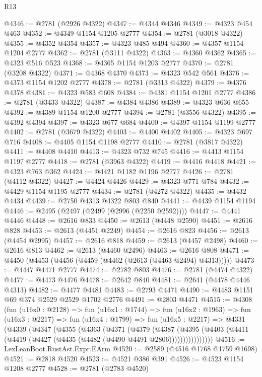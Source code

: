 \begin{lexlean}{R13}
\begin{coremodule}
@4346 := @2781 (@2926 @4322)
@4347 := @4344 @4346
@4349 := @4323 @454 @463
@4352 := @4349 @1154 @1205 @2777
@4354 := @2781 (@3018 @4322)
@4355 := @4352 @4354
@4357 := @4323 @485 @494
@4360 := @4357 @1154 @1204 @2777
@4362 := @2781 (@3111 @4322)
@4363 := @4360 @4362
@4365 := @4323 @516 @523
@4368 := @4365 @1154 @1203 @2777
@4370 := @2781 (@3208 @4322)
@4371 := @4368 @4370
@4373 := @4323 @542 @561
@4376 := @4373 @1154 @1202 @2777
@4378 := @2781 (@3313 @4322)
@4379 := @4376 @4378
@4381 := @4323 @583 @608
@4384 := @4381 @1154 @1201 @2777
@4386 := @2781 (@3433 @4322)
@4387 := @4384 @4386
@4389 := @4323 @636 @655
@4392 := @4389 @1154 @1200 @2777
@4394 := @2781 (@3556 @4322)
@4395 := @4392 @4394
@4397 := @4323 @677 @684
@4400 := @4397 @1154 @1199 @2777
@4402 := @2781 (@3679 @4322)
@4403 := @4400 @4402
@4405 := @4323 @697 @716
@4408 := @4405 @1154 @1198 @2777
@4410 := @2781 (@3817 @4322)
@4411 := @4408 @4410
@4413 := @4323 @732 @745
@4416 := @4413 @1154 @1197 @2777
@4418 := @2781 (@3963 @4322)
@4419 := @4416 @4418
@4421 := @4323 @763 @362
@4424 := @4421 @1182 @1196 @2777
@4426 := @2781 (@4112 @4322)
@4427 := @4424 @4426
@4429 := @4323 @771 @784
@4432 := @4429 @1154 @1195 @2777
@4434 := @2781 (@4272 @4322)
@4435 := @4432 @4434
@4439 := @2750 @4313 @4322 @803 @840
@4441 := @4439 @1154 @1194
@4446 := @2495 (@2497 (@2499 (@2996 (@2250 @2592))))
@4447 := @4441 @4446
@4448 := @2616 @833
@4450 := @2613 (@4448 @2590)
@4451 := @2616 @828
@4453 := @2613 (@4451 @2249)
@4454 := @2616 @823
@4456 := @2613 (@4454 @2995)
@4457 := @2616 @818
@4459 := @2613 (@4457 @2498)
@4460 := @2616 @813
@4462 := @2613 (@4460 @2496)
@4463 := @2616 @808
@4471 := @4450 (@4453 (@4456 (@4459 (@4462 (@2613 (@4463 @2494) @4313)))))
@4473 := @4447 @4471 @2777
@4474 := @2782 @803
@4476 := @2781 (@4474 @4322)
@4477 := @4473 @4476
@4478 := @2642 @840
@4481 := @2641 (@4478 @4446 @4313)
@4482 := @4477 @4481
@4483 := @2793 @4471
@4490 := @4483 @1151 @69 @374 @2529 @2529 @1702 @2776
@4491 := @2803 @4471
@4515 := @4308
    (fun (u16x0 : @2128) =>
    fun (u16x1 : @1744) =>
    fun (u16x2 : @1963) =>
    fun (u16x3 : @2217) =>
    fun (u16x4 : @1799) =>
    fun (u16x5 : @2217) =>
    @4331
      (@4339
        (@4347
          (@4355
            (@4363
              (@4371
                (@4379
                  (@4387
                    (@4395
                      (@4403 (@4411 (@4419 (@4427 (@4435 (@4482 (@4490 @4491 @2806))))))))))))))))
@4516 := LexLeanBoot.RustAst.Expr.EArm
@4520 := @2589 (@4516 @1768 @1759 @1698)
@4521 := @2818 @4520
@4523 := @4521 @386 @391
@4526 := @4523 @1154 @1208 @2777
@4528 := @2781 (@2783 @4520)

\end{coremodule}
\end{lexlean}
